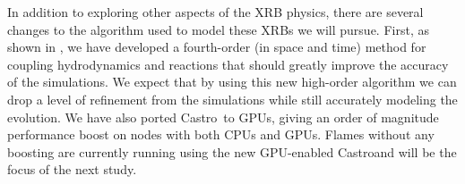 \documentclass[preprint,times,tighten]{aastex63}
\newcommand{\castro}{{\sf Castro}}
\newcommand{\pynucastro}{{\sf pynucastro}}
\newcommand{\MarginPar}[1]{
    \marginpar{\vskip-\baselineskip%
               \raggedright%
               \tiny\sffamily%
               {\color{red}\hrule%
               \smallskip%
               #1\par%
               \smallskip%
               \hrule}}%
}
\begin{document}




In addition to exploring other aspects of the XRB physics, there are several changes to the algorithm used to
model these XRBs we will pursue.  First, as shown in \citet{castro-sdc}, we have
developed a fourth-order (in space and time) method for coupling
hydrodynamics and reactions that should greatly improve the accuracy
of the simulations.  We expect that by using this new high-order
algorithm we can drop a level of refinement from the simulations while
still accurately modeling the evolution.  We have also ported
\castro\ to GPUs, giving an order of magnitude performance boost on
nodes with both CPUs and GPUs.  Flames without any boosting are currently running
using the new GPU-enabled \castro and will be the focus of the next study.

\end{document}
